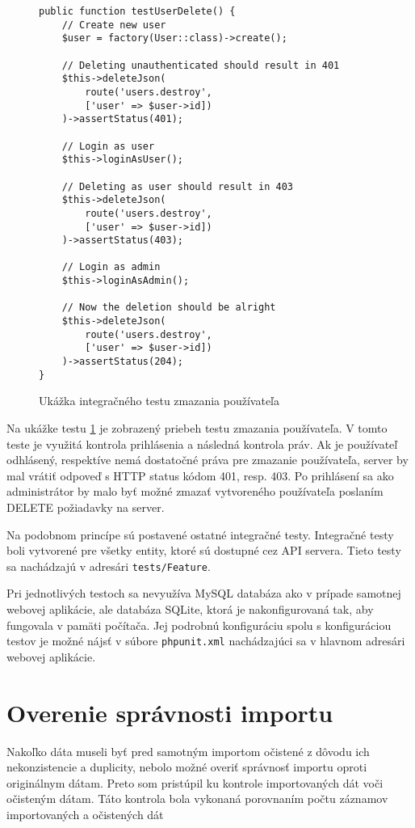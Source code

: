 \begin{figure}[H]
\begin{verbatim}
public function testUserDelete() {
    // Create new user
    $user = factory(User::class)->create();

    // Deleting unauthenticated should result in 401
    $this->deleteJson(
        route('users.destroy',
        ['user' => $user->id])
    )->assertStatus(401);

    // Login as user
    $this->loginAsUser();

    // Deleting as user should result in 403
    $this->deleteJson(
        route('users.destroy',
        ['user' => $user->id])
    )->assertStatus(403);

    // Login as admin
    $this->loginAsAdmin();

    // Now the deletion should be alright
    $this->deleteJson(
        route('users.destroy',
        ['user' => $user->id])
    )->assertStatus(204);
}
\end{verbatim}
\caption[Ukážka integračného testu zmazania používateľa]
{Ukážka integračného testu zmazania používateľa}
\label{user-delete-test-code}
\end{figure}

Na ukážke testu \ref{user-delete-test-code} je zobrazený priebeh testu zmazania používateľa. V tomto teste je využitá kontrola prihlásenia a následná kontrola práv. Ak je používateľ odhlásený, respektíve nemá dostatočné práva pre zmazanie používateľa, server by mal vrátiť odpoveď s HTTP status kódom 401, resp. 403. Po prihlásení sa ako administrátor by malo byť možné zmazať vytvoreného používateľa poslaním DELETE požiadavky na server.

\pagebreak 

Na podobnom princípe sú postavené ostatné integračné testy. Integračné testy boli vytvorené pre všetky entity, ktoré sú dostupné cez API servera. Tieto testy sa nachádzajú v adresári \texttt{tests/Feature}.

Pri jednotlivých testoch sa nevyužíva MySQL databáza ako v prípade samotnej webovej aplikácie, ale databáza SQLite, ktorá je nakonfigurovaná tak, aby fungovala v pamäti počítača. Jej podrobnú konfiguráciu spolu s konfiguráciou testov je možné nájsť v súbore \texttt{phpunit.xml} nachádzajúci sa v hlavnom adresári webovej aplikácie.

\section{Overenie správnosti importu}
Nakoľko dáta museli byť pred samotným importom očistené z dôvodu ich nekonzistencie a duplicity, nebolo možné overiť správnosť importu oproti originálnym dátam. Preto som pristúpil ku kontrole importovaných dát voči očisteným dátam. Táto kontrola bola vykonaná porovnaním počtu záznamov importovaných a očistených dát

